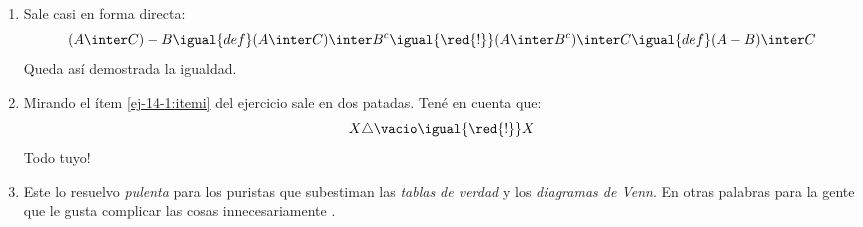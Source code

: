 \begin{enumerate}[label=\roman*)]
  \item Sale casi en forma directa:
        $$
          (A \inter C) - B
          \igual{def}
          (A \inter C) \inter B^c
          \igual{\red{!}}
          (A \inter B^c) \inter C
          \igual{def}
          (A - B) \inter C
        $$
        Queda así demostrada la igualdad.

  \item Mirando el ítem \ref{ej-14-1:itemi} del ejercicio sale en dos patadas.
        Tené en cuenta que:
        $$
          X \triangle \vacio
          \igual{\red{!}}
          X
        $$
        Todo tuyo!

  \item Este lo resuelvo \textit{pulenta} para los puristas que subestiman
        las \textit{tablas de verdad} y los \textit{diagramas de Venn}. En otras
        palabras para la gente que le gusta complicar las cosas innecesariamente .
        \begin{itemize}


\end{itemize}
\end{enumerate}
